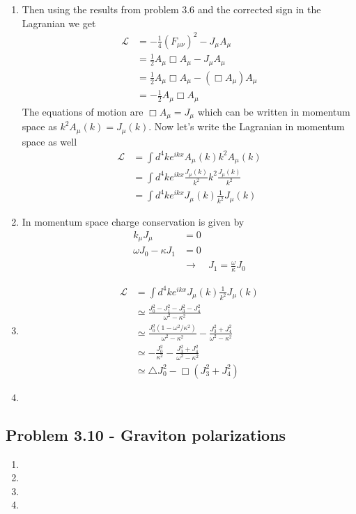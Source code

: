 \documentclass[10pt,a4paper]{book}
\theoremstyle{definition}
\begin{document}
\begin{enumerate}[label=(\alph*)]
\item Then using the results from problem 3.6 and the corrected sign in the Lagranian we get
\begin{align}
\mathcal{L}&=-\frac{1}{4}(F_{\mu\nu})^2-J_\mu A_\mu\\
&=\frac{1}{2}A_\mu\Box A_\mu-J_\mu A_\mu\\
&=\frac{1}{2}A_\mu\Box A_\mu-(\Box A_\mu) A_\mu\\
&=-\frac{1}{2}A_\mu\Box A_\mu
\end{align}
The equations of motion are $\Box A_\mu=J_\mu$ which can be written in momentum space as $k^2A_\mu(k)=J_\mu(k)$. Now let's write the Lagranian in momentum space as well
\begin{align}
\mathcal{L}&=\int d^4k e^{ikx}A_\mu(k)k^2A_\mu(k)\\
&=\int d^4k e^{ikx}\frac{J_\mu(k)}{k^2}k^2\frac{J_\mu(k)}{k^2}\\
&=\int d^4k e^{ikx}J_\mu(k)\frac{1}{k^2}J_\mu(k)
\end{align} 
\item In momentum space charge conservation is given by
\begin{align}
  k_\mu J_\mu&=0\\
  \omega J_0-\kappa J_1&=0\\
  &\rightarrow\quad J_1=\frac{\omega}{\kappa}J_0
\end{align}

\item
\begin{align}
\mathcal{L}&=\int d^4k e^{ikx}J_\mu(k)\frac{1}{k^2}J_\mu(k)\\
&\simeq\frac{J_0^2-J_1^2-J_3^2-J_4^2}{\omega^2-\kappa^2}\\
&\simeq\frac{J_0^2(1-\omega^2/\kappa^2)}{\omega^2-\kappa^2}-\frac{J_3^2+J_4^2}{\omega^2-\kappa^2}\\
&\simeq-\frac{J_0^2}{\kappa^2}-\frac{J_3^2+J_4^2}{\omega^2-\kappa^2}\\
&\simeq\triangle J_0^2-\Box(J_3^2+J_4^2)
\end{align} 

\item
\end{enumerate}


\subsection{Problem 3.10 - Graviton polarizations}
\begin{enumerate}[label=(\alph*)]
\item
\item
\item
\item
\end{enumerate}
\end{document}
